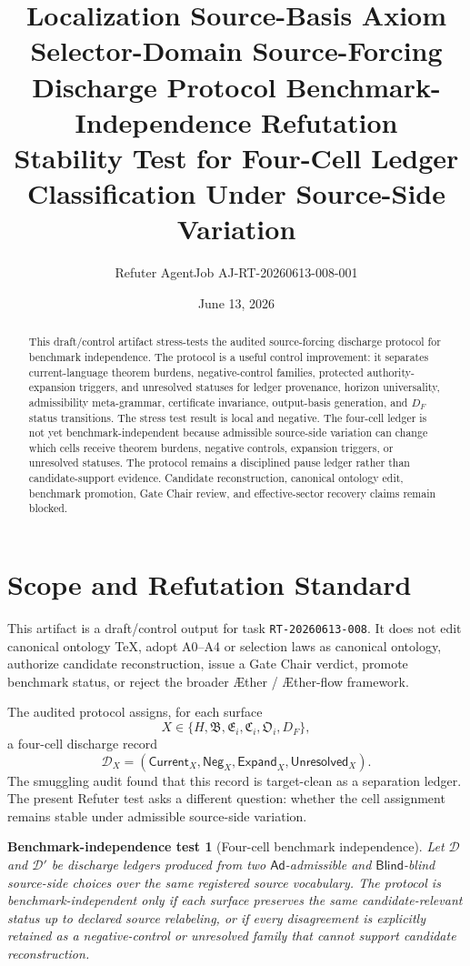 \documentclass[11pt]{article}
\title{\textbf{Localization Source-Basis Axiom Selector-Domain Source-Forcing Discharge Protocol Benchmark-Independence Refutation}\\[0.35em]
\large Stability Test for Four-Cell Ledger Classification Under Source-Side Variation}
\author{Refuter AgentJob AJ-RT-20260613-008-001}
\date{June 13, 2026}
\newcommand{\Aether}{\AE{}ther}
\newcommand{\Aflow}{\AE{}ther-flow}
\newcommand{\TheoryProgram}{\Aether{} / \Aflow{} framework}
\newcommand{\HorizonFam}{\mathfrak{B}}
\newcommand{\EnumFam}{\mathfrak{E}}
\newcommand{\CertFam}{\mathfrak{C}}
\newcommand{\OutFam}{\mathfrak{O}}
\newcommand{\Ad}{\mathsf{Ad}}
\newcommand{\Blind}{\mathsf{Blind}}
\newcommand{\Current}{\mathsf{Current}}
\newcommand{\Neg}{\mathsf{Neg}}
\newcommand{\Expand}{\mathsf{Expand}}
\newcommand{\Unres}{\mathsf{Unresolved}}
\newtheorem{test}{Benchmark-independence test}
\begin{document}
\maketitle

\begin{abstract}
This draft/control artifact stress-tests the audited source-forcing
discharge protocol for benchmark independence. The protocol is a useful
control improvement: it separates current-language theorem burdens,
negative-control families, protected authority-expansion triggers, and
unresolved statuses for ledger provenance, horizon universality,
admissibility meta-grammar, certificate invariance, output-basis generation,
and \(D_F\) status transitions. The stress test result is local and
negative. The four-cell ledger is not yet benchmark-independent because
admissible source-side variation can change which cells receive theorem
burdens, negative controls, expansion triggers, or unresolved statuses. The
protocol remains a disciplined pause ledger rather than candidate-support
evidence. Candidate reconstruction, canonical ontology edit, benchmark
promotion, Gate Chair review, and effective-sector recovery claims remain
blocked.
\end{abstract}

\section{Scope and Refutation Standard}

This artifact is a draft/control output for task \texttt{RT-20260613-008}.
It does not edit canonical ontology TeX, adopt A0--A4 or selection laws as
canonical ontology, authorize candidate reconstruction, issue a Gate Chair
verdict, promote benchmark status, or reject the broader \TheoryProgram{}.

The audited protocol assigns, for each surface
\[
X\in\{H,\HorizonFam,\EnumFam_i,\CertFam_i,\OutFam_i,D_F\},
\]
a four-cell discharge record
\[
\mathcal{D}_X=(\Current_X,\Neg_X,\Expand_X,\Unres_X).
\]
The smuggling audit found that this record is target-clean as a separation
ledger. The present Refuter test asks a different question: whether the cell
assignment remains stable under admissible source-side variation.

\begin{test}[Four-cell benchmark independence]
Let \(\mathcal{D}\) and \(\mathcal{D}'\) be discharge ledgers produced from
two \(\Ad\)-admissible and \(\Blind\)-blind source-side choices over the same
registered source vocabulary. The protocol is benchmark-independent only if
each surface preserves the same candidate-relevant status up to declared
source relabeling, or if every disagreement is explicitly retained as a
negative-control or unresolved family that cannot support candidate
reconstruction.
\end{test}
\end{document}
